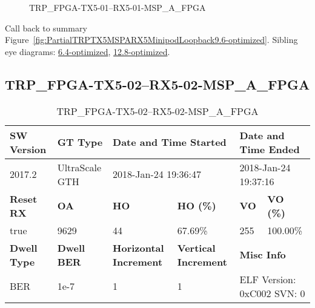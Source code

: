 \begin{figure}[h]
\caption{TRP\_FPGA-TX5-01--RX5-01-MSP\_A\_FPGA} \label{fig:TRPFPGATX501RX501MSPAFPGA9.6-optimized}
\end{figure}

Call back to summary Figure~\ref{fig:PartialTRPTX5MSPARX5MinipodLoopback9.6-optimized}.
Sibling eye diagrams: \hyperref[sec:TRPFPGATX501RX501MSPAFPGA6.4-optimized]{6.4-optimized}, \hyperref[sec:TRPFPGATX501RX501MSPAFPGA12.8-optimized]{12.8-optimized}.

\clearpage
\newpage


\subsection{TRP\_FPGA-TX5-02--RX5-02-MSP\_A\_FPGA}\label{sec:TRPFPGATX502RX502MSPAFPGA9.6-optimized}

\begin{table}[h]
\centering
\caption{TRP\_FPGA-TX5-02--RX5-02-MSP\_A\_FPGA}
\label{tab:TRPFPGATX502RX502MSPAFPGA9.6-optimized}
\begin{tabular}{@{}|l|l|l|l|l|l|@{}}
\toprule
\textbf{SW Version}                & \textbf{GT Type}   & \multicolumn{2}{l|}{\textbf{Date and Time Started}}            & \multicolumn{2}{l|}{\textbf{Date and Time Ended}}        \\ \midrule
2017.2                       & UltraScale GTH          & \multicolumn{2}{l|}{2018-Jan-24 19:36:47}                   & \multicolumn{2}{l|}{2018-Jan-24 19:37:16}               \\ \midrule
\textbf{Reset RX}                  & \textbf{OA} & \textbf{HO}   & \textbf{HO (\%)} & \textbf{VO} & \textbf{VO (\%)} \\ \midrule
true & 9629        & 44          & 67.69\%        & 255        & 100.00\%       \\ \midrule
\textbf{Dwell Type}                & \textbf{Dwell BER} & \textbf{Horizontal Increment} & \textbf{Vertical Increment}    & \multicolumn{2}{l|}{\textbf{Misc Info}}                  \\ \midrule
BER                            & 1e-7        & 1        & 1           & \multicolumn{2}{l|}{ELF Version: 0xC002 SVN: 0}                         \\ \bottomrule
\end{tabular}
\end{table}

